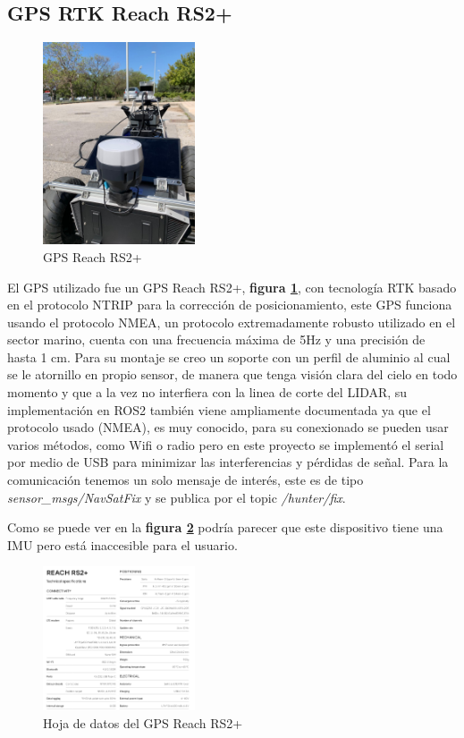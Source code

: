 \subsection{GPS RTK Reach RS2+}


\begin{figure}[H]
    \centering
    \includegraphics[width=0.4\textwidth]{images/reach_rs2.jpeg}
    \caption{GPS Reach RS2+}
    \label{fig:reach_rs2}
\end{figure}

El GPS utilizado fue un GPS Reach RS2+, \textbf{figura \ref{fig:reach_rs2}}, con tecnología RTK basado en el protocolo NTRIP para la 
corrección de posicionamiento, este GPS funciona usando el protocolo NMEA, un protocolo extremadamente robusto utilizado en el sector marino, 
cuenta con una frecuencia máxima de 5Hz y una precisión de hasta 1 cm. Para su montaje se creo un soporte con un perfil de aluminio al cual 
se le atornillo en propio sensor, de manera que tenga visión clara del cielo en todo momento y que a la vez no interfiera con la linea de 
corte del LIDAR, su implementación en ROS2 también viene ampliamente documentada ya que el protocolo usado (NMEA), es muy conocido, 
para su conexionado se pueden usar varios métodos, como Wifi o radio pero en este proyecto se implementó el serial por medio de USB para 
minimizar las interferencias y pérdidas de señal. Para la comunicación tenemos un solo mensaje de interés, este es de tipo \textit{sensor\_msgs/NavSatFix} 
y se publica por el topic \textit{/hunter/fix}.

Como se puede ver en la \textbf{figura \ref{fig:datasheet_reach}} podría parecer que este dispositivo tiene una IMU pero está inaccesible para 
el usuario.

\begin{figure}[H]
    \centering
    \includegraphics[width=0.4\textwidth]{images/reach_datasheet.png}
    \caption{Hoja de datos del GPS Reach RS2+}
    \label{fig:datasheet_reach}
\end{figure}




